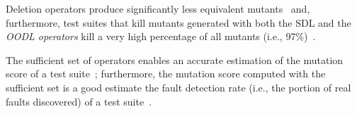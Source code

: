 Deletion operators produce significantly less equivalent mutants~
\cite{delamaro2014designing,delamaro2014experimental} and, furthermore, 
test suites that kill mutants generated with both the SDL and the \emph{OODL operators} kill a very high percentage of all mutants (i.e., 97\%)~\cite{delamaro2014experimental}. 

%
%



The sufficient set of operators enables an accurate estimation of the mutation score of a test suite~\cite{siami2008sufficient}; furthermore, the mutation score computed with the sufficient set is a good estimate the fault detection rate (i.e., the portion of real faults discovered) of a test suite~\cite{andrews2005mutation}. 


